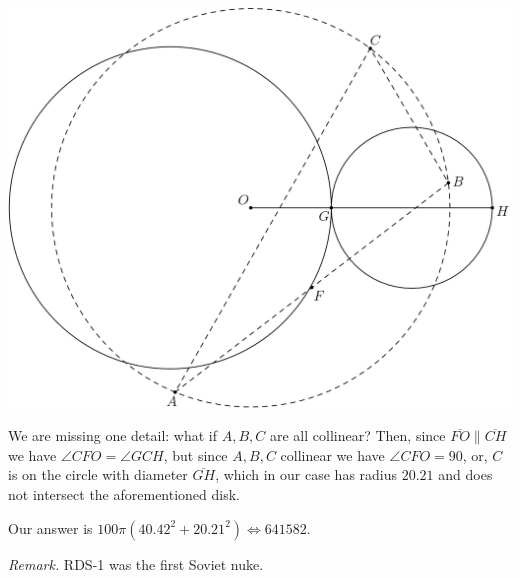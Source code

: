 \begin{solution}
    \begin{center}
        \includegraphics[scale=0.4]{Sections/Files/14-1-7.png}
    \end{center}

    We are missing one detail: what if $A, B, C$ are all collinear? Then, since $\overline{FO} \parallel \overline{CH}$ we have $\angle CFO = \angle GCH$, 
    but since $A, B, C$ collinear we have $\angle CFO = 90$, or, $C$ is on the circle with diameter $\overline{GH}$, which in our case has radius $20.21$
    and does not intersect the aforementioned disk. \medskip
    
    Our answer is $100\pi\left(40.42^2 + 20.21^2\right) \iff \boxed{641582}.$ \medskip

    \textit{Remark.} RDS-1 was the first Soviet nuke. 
\end{solution}\bigskip

